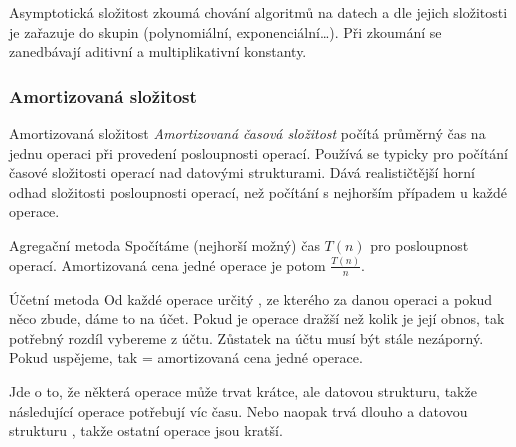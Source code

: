 \begin{poznamka} 
  Asymptotická složitost zkoumá chování algoritmů na  datech a dle
  jejich složitosti je zařazuje do skupin (polynomiální, exponenciální\dots).
  Při zkoumání se zanedbávají aditivní a multiplikativní konstanty. 
\end{poznamka}

\subsubsection*{Amortizovaná složitost}

\begin{definiceN}{Amortizovaná složitost}
  \emph{Amortizovaná časová složitost} počítá průměrný čas na jednu operaci při provedení
  posloupnosti operací. Používá se typicky pro počítání časové složitosti operací
  nad datovými strukturami. Dává realističtější horní odhad složitosti
  posloupnosti operací, než počítání s nejhorším případem u každé operace.
\end{definiceN}

\begin{obecne}{Agregační metoda}
  Spočítáme (nejhorší možný) čas $T(n)$ pro posloupnost operací. Amortizovaná cena
  jedné operace je potom $\frac{T(n)}{n}$.
\end{obecne}

\begin{obecne}{Účetní metoda}
  Od každé operace  určitý , ze kterého  za
  danou operaci a pokud něco zbude, dáme to na účet. Pokud je operace dražší než
  kolik je její obnos, tak potřebný rozdíl vybereme z účtu. Zůstatek na účtu
  musí být stále nezáporný. Pokud uspějeme, tak  = amortizovaná cena
  jedné operace.
\end{obecne}

\begin{poznamka}
  Jde o to, že některá operace může trvat krátce, ale  datovou
  strukturu, takže následující operace potřebují víc času. Nebo naopak trvá
  dlouho a datovou strukturu , takže ostatní operace jsou kratší.
\end{poznamka}
